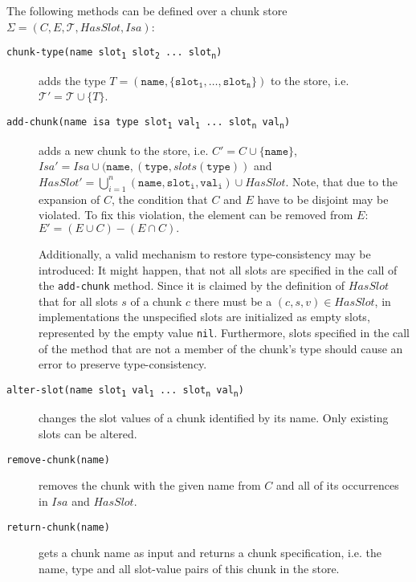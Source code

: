 \begin{definition}
\label{def:abstract_methods_chunk_store}
The following methods can be defined over a chunk store $\Sigma = (C, E, \mathcal{T}, HasSlot, Isa)$:

\begin{description}
 \item[\texttt{chunk-type(name slot\textsubscript{1} slot\textsubscript{2} ... slot\textsubscript{n})}] adds the type $T = (\mathtt{name},\{\mathtt{slot_1}, \dots, \mathtt{slot_n}\})$ to the store, i.e. $\mathcal{T'} = \mathcal{T} \cup \{T\}$. 
 \item[\texttt{add-chunk(name isa type slot\textsubscript{1} val\textsubscript{1} ... slot\textsubscript{n} val\textsubscript{n})}] adds a new chunk to the store, i.e. $C' = C \cup \{ \mathtt{name} \}$, $Isa' = Isa \cup (\mathtt{name}, (\mathtt{type}, slots(\mathtt{type}))$ and $HasSlot' = \bigcup_{i = 1}^n{\mathtt{(name,slot_i,val_i)}} \cup HasSlot.$ Note, that due to the expansion of $C$, the condition that $C$ and $E$ have to be disjoint may be violated. To fix this violation, the element can be removed from $E$: $E' = (E \cup C) - (E \cap C).$ 
 
 Additionally, a valid mechanism to restore type-consistency may be introduced: It might happen, that not all slots are specified in the call of the \verb|add-chunk| method. Since it is claimed by the definition of $HasSlot$ that for all slots $s$ of a chunk $c$ there must be a $(c,s,v) \in HasSlot$, in implementations the unspecified slots are initialized as empty slots, represented by the empty value \verb|nil|. Furthermore, slots specified in the call of the method that are not a member of the chunk's type should cause an error to preserve type-consistency.
  \item[\texttt{alter-slot(name slot\textsubscript{1} val\textsubscript{1} ... slot\textsubscript{n} val\textsubscript{n})}] changes the slot values of a chunk identified by its name. Only existing slots can be altered.
  \item[\texttt{remove-chunk(name)}] removes the chunk with the given name from $C$ and all of its occurrences in $Isa$ and $HasSlot$.
  \item[\texttt{return-chunk(name)}] gets a chunk name as input and returns a chunk specification, i.e. the name, type and all slot-value pairs of this chunk in the store.
\end{description} 
\end{definition}


